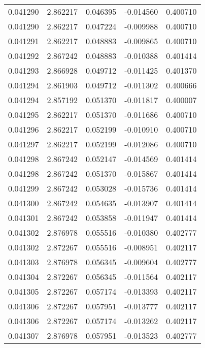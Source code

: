 \begin{tabular}{lrrrr}
0.041290    &  2.862217 &  0.046395 & -0.014560 &             0.400710 \\
0.041290    &  2.862217 &  0.047224 & -0.009988 &             0.400710 \\
0.041291    &  2.862217 &  0.048883 & -0.009865 &             0.400710 \\
0.041292    &  2.867242 &  0.048883 & -0.010388 &             0.401414 \\
0.041293    &  2.866928 &  0.049712 & -0.011425 &             0.401370 \\
0.041294    &  2.861903 &  0.049712 & -0.011302 &             0.400666 \\
0.041294    &  2.857192 &  0.051370 & -0.011817 &             0.400007 \\
0.041295    &  2.862217 &  0.051370 & -0.011686 &             0.400710 \\
0.041296    &  2.862217 &  0.052199 & -0.010910 &             0.400710 \\
0.041297    &  2.862217 &  0.052199 & -0.012086 &             0.400710 \\
0.041298    &  2.867242 &  0.052147 & -0.014569 &             0.401414 \\
0.041298    &  2.867242 &  0.051370 & -0.015867 &             0.401414 \\
0.041299    &  2.867242 &  0.053028 & -0.015736 &             0.401414 \\
0.041300    &  2.867242 &  0.054635 & -0.013907 &             0.401414 \\
0.041301    &  2.867242 &  0.053858 & -0.011947 &             0.401414 \\
0.041302    &  2.876978 &  0.055516 & -0.010380 &             0.402777 \\
0.041302    &  2.872267 &  0.055516 & -0.008951 &             0.402117 \\
0.041303    &  2.876978 &  0.056345 & -0.009604 &             0.402777 \\
0.041304    &  2.872267 &  0.056345 & -0.011564 &             0.402117 \\
0.041305    &  2.872267 &  0.057174 & -0.013393 &             0.402117 \\
0.041306    &  2.872267 &  0.057951 & -0.013777 &             0.402117 \\
0.041306    &  2.872267 &  0.057174 & -0.013262 &             0.402117 \\
0.041307    &  2.876978 &  0.057951 & -0.013523 &             0.402777 \\

\end{tabular}
